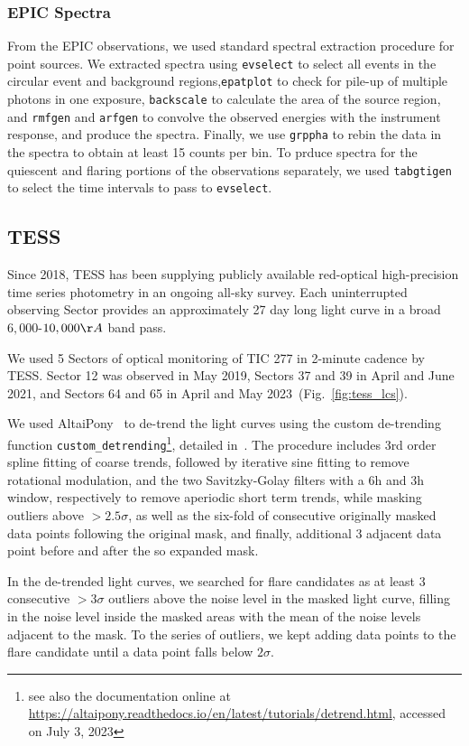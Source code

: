 \documentclass[twocolumn]{aastex631}
\begin{document}
\subsubsection{EPIC Spectra}
From the EPIC observations, we used standard spectral extraction procedure for point sources. We extracted spectra using \texttt{evselect} to select all events in the circular event and background regions,\texttt{epatplot} to check for pile-up of multiple photons in one exposure, \texttt{backscale} to calculate the area of the source region, and \texttt{rmfgen} and \texttt{arfgen} to convolve the observed energies with the instrument response, and produce the spectra. Finally, we use \texttt{grppha} to rebin the data in the spectra to obtain at least 15 counts per bin. To prduce spectra for the quiescent and flaring portions of the observations separately, we used \texttt{tabgtigen} to select the time intervals to pass to \texttt{evselect}.

\subsection{TESS}
\label{sec:obs:tess}
Since 2018, TESS has been supplying publicly available red-optical high-precision time series photometry in an ongoing all-sky survey. Each uninterrupted observing Sector provides an approximately 27 day long light curve in a broad $6,000$-$10,000\AA$ band pass. 

We used 5 Sectors of optical monitoring of TIC 277 in 2-minute cadence by TESS. Sector 12 was observed in May 2019, Sectors 37 and 39 in April and June 2021, and Sectors 64 and 65 in April and May 2023~(Fig.~\ref{fig:tess_lcs}). 

We used AltaiPony~\citep{ilin2021altaipony} to de-trend the light curves using the custom de-trending function \texttt{custom\_detrending}\footnote{see also the documentation online at \url{https://altaipony.readthedocs.io/en/latest/tutorials/detrend.html}, accessed on July 3, 2023}, detailed in~\citet{ilin2022searching}. The procedure includes 3rd order spline fitting of coarse trends, followed by iterative sine fitting to remove rotational modulation, and the two Savitzky-Golay filters with a 6h and 3h window, respectively to remove aperiodic short term trends, while masking outliers above $>2.5\sigma$, as well as the six-fold of consecutive originally masked data points following the original mask, and finally, additional 3 adjacent data point before and after the so expanded mask. 

In the de-trended light curves, we searched for flare candidates as at least 3 consecutive $>3\sigma$ outliers above the noise level in the masked light curve, filling in the noise level inside the masked areas with the mean of the noise levels adjacent to the mask. To the series of outliers, we kept adding data points to the flare candidate until a data point falls below $2\sigma$. 
\end{document}
